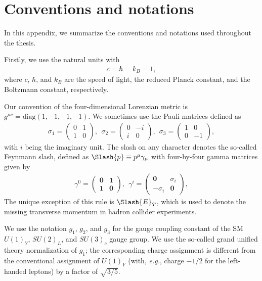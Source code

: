 \documentclass[12pt,twoside,book]{article}
\begin{document}
\section{Conventions and notations}
\label{sec:convention}

\vskip 0.1in

In this appendix, we summarize the conventions and notations used throughout the thesis.

Firstly, we use the natural units with
\begin{align}
  c = \hbar = k_B = 1,
\end{align}
where $c$, $\hbar$, and $k_B$ are the speed of light, the reduced Planck constant, and the Boltzmann constant, respectively.

Our convention of the four-dimensional Lorenzian metric is $g^{\mu \nu} = \mathrm{diag} (1, -1, -1, -1)$.
We sometimes use the Pauli matrices defined as
\begin{align}
  \sigma_1 =
  \begin{pmatrix}
    0 & 1\\
    1 & 0
  \end{pmatrix},
  ~~
  \sigma_2 =
  \begin{pmatrix}
    0 & -i\\
    i & 0
  \end{pmatrix},
  ~~
  \sigma_3 =
  \begin{pmatrix}
    1 & 0\\
    0 & -1
  \end{pmatrix},
\end{align}
with $i$ being the imaginary unit.
The slash on any character denotes the so-called Feynmann slash, defined as $\Slash{p} \equiv p^\mu \gamma_\mu$ with four-by-four gamma matrices given by
\begin{align}
  \gamma^0 =
  \begin{pmatrix}
    \bm{0} & \bm{1}\\
    \bm{1} & \bm{0}
  \end{pmatrix},
  ~~
  \gamma^i =
  \begin{pmatrix}
    \bm{0} & \sigma_i\\
    -\sigma_i & \bm{0}
  \end{pmatrix},
\end{align}
The unique exception of this rule is $\Slash{E}_T$, which is used to denote the missing transverse momentum in hadron collider experiments.

We use the notation $g_1$, $g_2$, and $g_3$ for the gauge coupling constant of the SM $U(1)_Y$, $SU(2)_L$, and $SU(3)_c$ gauge group.
We use the so-called grand unified theory normalization of $g_1$; the corresponding charge assignment is different from the conventional assignment of $U(1)_Y$ (with, \textit{e.g.}, charge $-1/2$ for the left-handed leptons) by a factor of $\sqrt{3/5}$.
\end{document}

